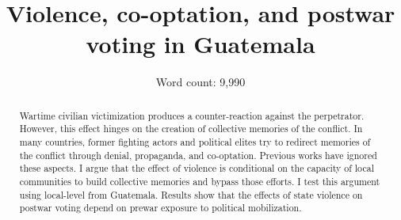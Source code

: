 \documentclass[12pt, notitlepage]{article}
\title{\Large Violence, co-optation, and postwar voting in Guatemala}
\author{}%
\date{Word count: 9,990}
\begin{document}
\maketitle
\thispagestyle{empty}

\vspace{30pt}

\begin{abstract}

Wartime civilian victimization produces a counter-reaction against the perpetrator. However, this effect hinges on the creation of collective memories of the conflict. In many countries, former fighting actors and political elites try to redirect memories of the conflict through denial, propaganda, and co-optation. Previous works have ignored these aspects. I argue that the effect of violence is conditional on the capacity of local communities to build collective memories and bypass those efforts. I test this argument using local-level from Guatemala. Results show that the effects of state violence on postwar voting depend on prewar exposure to political mobilization.

\end{abstract}

\newpage
\setcounter{page}{1}
\end{document}
